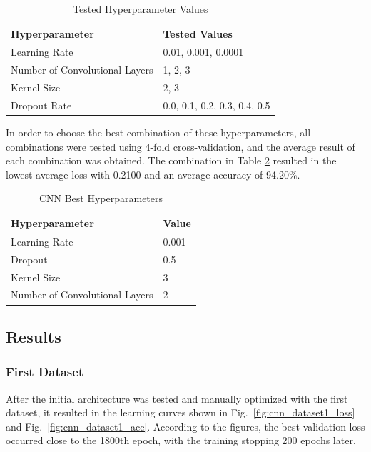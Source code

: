 \begin{table}[H]
    \centering
    \caption{Tested Hyperparameter Values}
    \label{table:cnn_hyperparameters}
    \begin{tabular}{|l|l|}
        \hline
        Hyperparameter & Tested Values \\
        \hline
        Learning Rate & 0.01, 0.001, 0.0001 \\
        \hline
        Number of Convolutional Layers & 1, 2, 3 \\
        \hline
        Kernel Size & 2, 3 \\
        \hline
        Dropout Rate & 0.0, 0.1, 0.2, 0.3, 0.4, 0.5 \\
        \hline
    \end{tabular}
\end{table}

In order to choose the best combination of these hyperparameters, all combinations were tested using 4-fold cross-validation, and the average result of each combination was obtained. The combination in Table \ref{table:cnn_best_hyperparameters} resulted in the lowest average loss with 0.2100 and an average accuracy of 94.20\%.

\begin{table}[H]
    \centering
    \caption{CNN Best Hyperparameters}
    \label{table:cnn_best_hyperparameters}
    \begin{tabular}{|l|l|}
        \hline
        Hyperparameter & Value \\
        \hline
        Learning Rate & 0.001 \\
        \hline
        Dropout & 0.5 \\
        \hline
        Kernel Size & 3 \\
        \hline
        Number of Convolutional Layers & 2 \\
        \hline
    \end{tabular}
\end{table}

\subsection{Results}

\subsubsection{First Dataset}

After the initial architecture was tested and manually optimized with the first dataset, it resulted in the learning curves shown in Fig.~\ref{fig:cnn_dataset1_loss} and Fig.~\ref{fig:cnn_dataset1_acc}. According to the figures, the best validation loss occurred close to the 1800th epoch, with the training stopping 200 epochs later.

